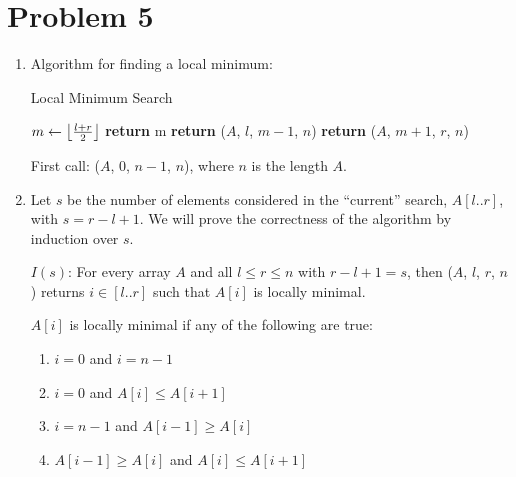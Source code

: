 \documentclass[12pt,a4paper]{article}
\begin{document}
	\section*{Problem 5}
		\begin{enumerate}[label=(\alph*)]
			\item Algorithm for finding a local minimum\footnotemark:
			\begin{algorithm}[h!]
				\begin{algorithmic}[1]
					\caption{Local Minimum Search}\label{alg:p5}
							\State $m \gets \floor*{\frac{l + r}{2}}$
								\State \textbf{return} m 
								\State \textbf{return} ($A$, $l$, $m - 1$, $n$)
							\Else {}
								\State \textbf{return} ($A$, $m + 1$, $r$, $n$)
							\EndIf
						\EndFunction
				\end{algorithmic}
			\end{algorithm}

			First call: ($A$, 0, $n - 1$, $n$), where $n$ is the length $A$.


			\item
			Let $s$ be the number of elements considered in the ``current'' search, $A[l..r]$, with $s = r - l + 1$. We will prove the correctness of the algorithm by induction over $s$.

			$I(s)$: For every array $A$ and all $l \le r \le n$ with $r - l + 1 = s$, then ($A$, $l$, $r$, $n$) returns $i \in [l..r]$ such that $A[i]$ is locally minimal.
			
			$A[i]$ is locally minimal if any of the following are true:
			\begin{enumerate}[label=\arabic*., noitemsep]
				\item \label{localmin:1} $i = 0$ and $i = n - 1$
				\item \label{localmin:2} $i = 0$ and $A[i] \le A[i + 1]$
				\item \label{localmin:3} $i = n - 1$ and $A[i - 1] \ge A[i]$
				\item \label{localmin:4} $A[i - 1] \ge A[i]$ and $A[i] \le A[i + 1]$
			\end{enumerate}


\end{enumerate}
\end{document}
